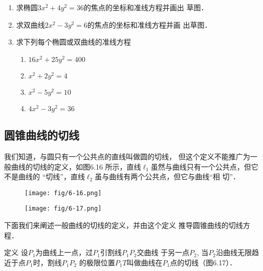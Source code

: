 \begin{ex}
\begin{enumerate}
    \item 求椭圆$3x^2+4y^2=36$的焦点的坐标和准线方程并画出
    草图．
    \item 求双曲线$2x^2-3y^2=6$的焦点的坐标和准线方程并画
    出草图．
    \item 求下列每个椭圆或双曲线的准线方程
\begin{multicols}{2}
\begin{enumerate}
    \item $16x^2+25y^2=400$
    \item $x^2+2y^2=4$
    \item $x^2-5y^2=10$
    \item $4x^2-3y^2=36$
\end{enumerate}
\end{multicols}
\end{enumerate} 
\end{ex}


\subsection{圆锥曲线的切线}
我们知道，与圆只有一个公共点的直线叫做圆的切线，
但这个定义不能推广为一般曲线的切线的定义，如图6.16
所示，直线$\ell_1$虽然与曲线只有一个公共点，但它不是曲线的
“切线”，直线$\ell_2$虽与曲线有两个公共点，但它与曲线“相
切”．

\begin{figure}[htp]\centering
    \begin{minipage}[t]{0.48\textwidth}
    \centering
\texttt{[image: fig/6-16.png]}
    \caption{}
    \end{minipage}
    \begin{minipage}[t]{0.48\textwidth}
    \centering
\texttt{[image: fig/6-17.png]}
    \caption{}
    \end{minipage}
    \end{figure}

下面我们来阐述一般曲线的切线的定义，并由这个定义
推导圆锥曲线的切线方程．

\begin{blk}
   {定义} 设$P_1$为曲线上一点，过$P_1$引割线$P_1P_2$交曲线
于另一点$P_2$, 当$P_2$沿曲线无限趋近于点$P_1$时，割线$P_1P_2$
的极限位置$P_1T$叫做曲线在$P_1$点的切线（图6.17）． 
\end{blk}

